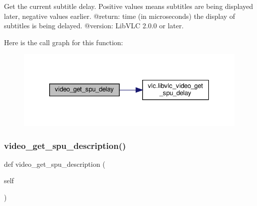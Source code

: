 \begin{DoxyVerb}Get the current subtitle delay. Positive values means subtitles are being
displayed later, negative values earlier.
@return: time (in microseconds) the display of subtitles is being delayed.
@version: LibVLC 2.0.0 or later.
\end{DoxyVerb}
 Here is the call graph for this function\+:
\nopagebreak
\begin{figure}[H]
\begin{center}
\leavevmode
\includegraphics[width=326pt]{classvlc_1_1_media_player_a0740b3afdcb610907d0c82358d09f5a6_cgraph}
\end{center}
\end{figure}
\mbox{\label{classvlc_1_1_media_player_a80f66276b0f1860d19dd5d771e7db936}} 
\subsubsection{\texorpdfstring{video\+\_\+get\+\_\+spu\+\_\+description()}{video\_get\_spu\_description()}}
{\footnotesize\ttfamily def video\+\_\+get\+\_\+spu\+\_\+description (\begin{DoxyParamCaption}\item[{}]{self }\end{DoxyParamCaption})}

